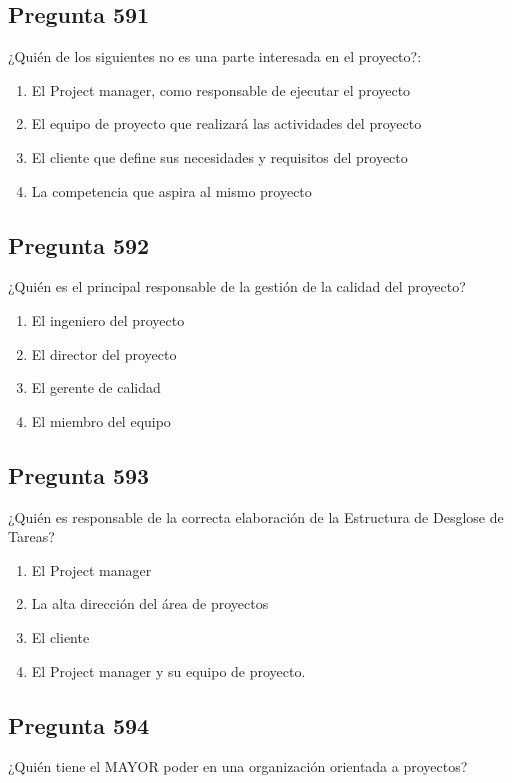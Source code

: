 \documentclass[11pt,a4paper]{article}
\begin{document}
\subsection*{Pregunta 591}
¿Quién de los siguientes no es una parte interesada en el proyecto?:

\begin{enumerate}[label=\alph*)]
  \item El Project manager, como responsable de ejecutar el proyecto
  \item El equipo de proyecto que realizará las actividades del proyecto
  \item El cliente que define sus necesidades y requisitos del proyecto
  \item La competencia que aspira al mismo proyecto
\end{enumerate}

\subsection*{Pregunta 592}
¿Quién es el principal responsable de la gestión de la calidad del proyecto?

\begin{enumerate}[label=\alph*)]
  \item El ingeniero del proyecto
  \item El director del proyecto
  \item El gerente de calidad
  \item El miembro del equipo
\end{enumerate}

\subsection*{Pregunta 593}
¿Quién es responsable de la correcta elaboración de la Estructura de Desglose de Tareas?

\begin{enumerate}[label=\alph*)]
  \item El Project manager
  \item La alta dirección del área de proyectos
  \item El cliente
  \item El Project manager y su equipo de proyecto.
\end{enumerate}

\subsection*{Pregunta 594}
¿Quién tiene el MAYOR poder en una organización orientada a proyectos?
\end{document}
